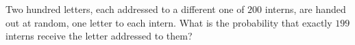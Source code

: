 Two hundred letters, each addressed to a different one of $200$ interns, are handed out at random, one letter to each intern. What is the probability that exactly $199$ interns receive the letter addressed to them?
